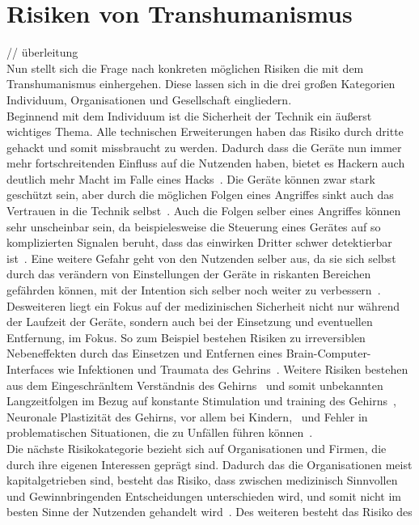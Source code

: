 \documentclass[a4paper,
DIV=13,
12pt,
BCOR=10mm,
department=FakEI,
twoside,
parskip=half,
automark,
]{OTHRartcl}
\begin{document}
\section*{Risiken von Transhumanismus}
// überleitung
\\
Nun stellt sich die Frage nach konkreten möglichen Risiken die mit dem Transhumanismus einhergehen. Diese lassen sich in die drei großen Kategorien Individuum, Organisationen und Gesellschaft eingliedern.\\
Beginnend mit dem Individuum ist die Sicherheit der Technik ein äußerst wichtiges Thema. Alle technischen Erweiterungen haben das Risiko durch dritte gehackt und somit missbraucht zu werden.
Dadurch dass die Geräte nun immer mehr fortschreitenden Einfluss auf die Nutzenden haben, bietet es Hackern auch deutlich mehr Macht im Falle eines Hacks~\cite{khan_aziz_2019}.
Die Geräte können zwar stark geschützt sein, aber durch die möglichen Folgen eines Angriffes sinkt auch das Vertrauen in die Technik selbst~\cite{khan_aziz_2019}.
Auch die Folgen selber eines Angriffes können sehr unscheinbar sein, da beispielesweise die Steuerung eines Gerätes auf so komplizierten Signalen beruht, dass das einwirken Dritter schwer detektierbar ist~\cite{khan_aziz_2019}.
Eine weitere Gefahr geht von den Nutzenden selber aus, da sie sich selbst durch das verändern von Einstellungen der Geräte in riskanten Bereichen gefährden können, mit der Intention sich selber noch weiter zu verbessern~\cite{khan_aziz_2019}.\\
Desweiteren liegt ein Fokus auf der medizinischen Sicherheit nicht nur während der Laufzeit der Geräte, sondern auch bei der Einsetzung und eventuellen Entfernung, im Fokus. So zum Beispiel bestehen Risiken zu irreversiblen Nebeneffekten durch das
Einsetzen und Entfernen eines Brain-Computer-Interfaces wie Infektionen und Traumata des Gehrins~\cite{Burwell:2017aa}. Weitere Risiken bestehen aus dem Eingeschränltem Verständnis des Gehirns~\cite{khan_aziz_2019} und somit unbekannten
Langzeitfolgen im Bezug auf konstante Stimulation und training des Gehirns~\cite{Burwell:2017aa}, Neuronale Plastizität des Gehirns, vor allem bei Kindern,~\cite{Burwell:2017aa} und Fehler in problematischen Situationen, die zu Unfällen
führen können~\cite{Burwell:2017aa}. \\Die nächste Risikokategorie bezieht sich auf Organisationen und Firmen, die durch ihre eigenen Interessen geprägt sind. Dadurch das die Organisationen meist kapitalgetrieben sind, besteht
das Risiko, dass zwischen medizinisch Sinnvollen und Gewinnbringenden Entscheidungen unterschieden wird, und somit nicht im besten Sinne der Nutzenden gehandelt wird~\cite{khan_aziz_2019}. Des weiteren besteht das Risiko des
\end{document}
